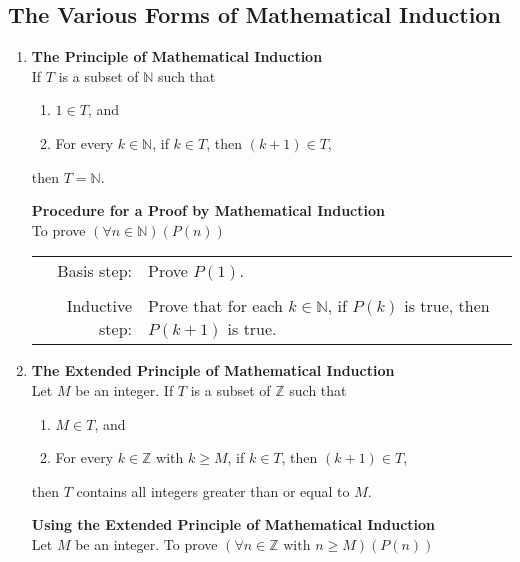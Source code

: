 \subsection*{The Various Forms of Mathematical Induction} 
\label{SS:induction}
\begin{enumerate}
\item \textbf{The Principle of Mathematical Induction}\\  
%
%
If  $T$  is a subset of  $\mathbb{N}$ such that
\begin{enumerate}
  \item $1 \in T$\!, and   
  \item For every  $k \in \mathbb{N}$, if  $k \in T$\!, then  $\left( {k + 1} \right) \in T$\!,
\end{enumerate}
then  $T = \mathbb{N}$.

\noindent
\textbf{Procedure for a Proof by Mathematical Induction}\\  
To prove  $\left( {\forall n \in \mathbb{N}} \right)\left( {P( n )} \right)$

\begin{tabular}{r p{3in}}
Basis step:        &    Prove  $P( 1 )$.  \\
                   &                                 \\
Inductive step:    &  Prove that for each  $k \in \mathbb{N}$, if  $P( k )$ is true, then  
$P( {k + 1} )$ is true. \\
\end{tabular}

\item \textbf{The Extended Principle of Mathematical Induction}\\  
%
%
Let  $M$  be an integer.  If  $T$  is a subset of  $\mathbb{Z}$ such that
\begin{enumerate}
  \item $M \in T$, and
  \item For every  $k \in \mathbb{Z}$ with $k \geq M$, if  $k \in T$, then  $\left( {k + 1} \right) \in T$,
\end{enumerate}
then  $T$  contains all integers greater than or equal to  $M$\!.  

\textbf{Using the Extended Principle of Mathematical Induction} \\
Let  $M$  be an integer.  To prove $\left( {\forall n \in \mathbb{Z} \text{ with } n \geq M} \right)\left( {P( n )} \right)$


\end{enumerate}
